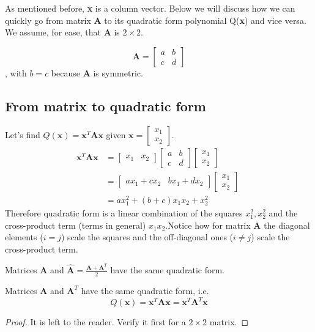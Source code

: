 \documentclass[a4paper]{article}
\numberwithin{equation}{section} %
\begin{document}
As mentioned before, \textbf{x} is a column vector. Below we will discuss how we can quickly go from matrix \textbf{A} to its quadratic form polynomial Q(\textbf{x}) and vice versa. We assume, for ease, that \textbf{A} is $2\times2$.

\begin{equation*}
\textbf{A}=
\begin{bmatrix}
    a & b \\
    c & d
\end{bmatrix}
\end{equation*}
, with $b=c$ because \textbf{A} is symmetric.


\subsection{From matrix to quadratic form}
Let's find $Q(\textbf{x})=\textbf{x}^{T}\textbf{Ax}$ given $\textbf{x}=\begin{bmatrix}x_{1}\\x_{2}\end{bmatrix}$.
\begin{equation*}
  \begin{split}
  \textbf{x}^{T}\textbf{Ax}
  	&=
  	\begin{bmatrix}x_{1}&x_{2}\end{bmatrix}\begin{bmatrix}
    	a & b \\
    	c & d
	\end{bmatrix}
	\begin{bmatrix}x_{1}\\x_{2}\end{bmatrix}\\
    &=\begin{bmatrix}ax_{1}+cx_{2}&bx_{1}+dx_{2}\end{bmatrix} \begin{bmatrix}x_{1}\\x_{2}\end{bmatrix}\\
    &=ax_{1}^{2} + (b + c)x_{1}x_{2} + x_{2}^{2}
  	\end{split}
 \;
\end{equation*}
Therefore quadratic form is a linear combination of the squares $x_{1}^{2}, x_{2}^{2}$ and the cross-product term (terms in general) $x_{1}x_{2}. $Notice how for matrix \textbf{A} the diagonal elements ($i=j$) scale the squares and the off-diagonal ones ($i\neq j$) scale the cross-product term.
\begin{lemma}
Matrices \textbf{A} and $\hat{\textbf{A}}=\frac{\textbf{A}+\textbf{A}^{T}}{2}$ have the same quadratic form.
\end{lemma}
\begin{lemma}
Matrices \textbf{A} and $\textbf{A}^{T}$  have the same quadratic form, i.e.
\begin{equation}
Q(\textbf{x})=\textbf{x}^{T}\textbf{Ax}=\textbf{x}^{T}\textbf{A}^{T}\textbf{x}
\end{equation}
\begin{proof}
It is left to the reader. Verify it first for a $2\times2$ matrix.
\end{proof}
\end{lemma}
\end{document}
